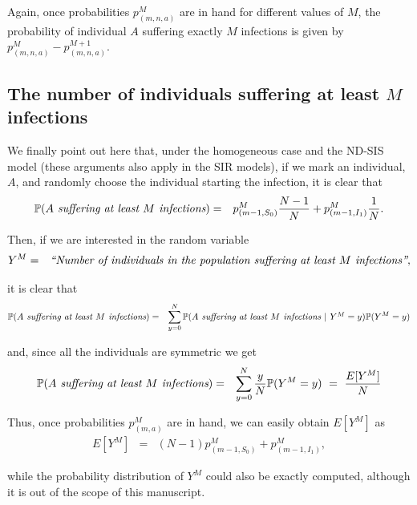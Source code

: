 \documentclass[10pt,A4paper]{article}
\begin{document}
\par\noindent Again, once probabilities $p^M_{(m,n,a)}$ are in hand for different values of $M$, the probability of individual $A$
suffering exactly $M$ infections is given by $p^M_{(m,n,a)}-p^{M+1}_{(m,n,a)}$.

\subsection{The number of individuals suffering at least $M$ infections}

\par We finally point out here that, under the homogeneous case and the ND-SIS model (these arguments also apply in the SIR models), if we mark an individual, $A$, and randomly choose the individual starting
the infection, it is clear that
\begin{eqnarray*}
\mathbb{P}(\hbox{\it $A$ suffering at least $M$ infections}) &=& p^M_{(m-1,S_0)}\frac{N-1}{N}+p^M_{(m-1,I_1)}\frac{1}{N}.
\end{eqnarray*}
\par\noindent Then, if we are interested in the random variable
\begin{eqnarray*}
 Y^M &=& \hbox{\it ``Number of individuals in the population suffering at least $M$ infections''},
\end{eqnarray*}
\par\noindent it is clear that
\begin{eqnarray*}
 \mathbb{P}(\hbox{\it $A$ suffering at least $M$ infections}) &=& \sum\limits_{y=0}^N\mathbb{P}(\hbox{\it $A$ suffering at least $M$ infections $|$ $Y^M=y$})\mathbb{P}(Y^M=y)
\end{eqnarray*}
\par\noindent and, since all the individuals are symmetric we get
\begin{eqnarray*}
 \mathbb{P}(\hbox{\it $A$ suffering at least $M$ infections}) &=& \sum\limits_{y=0}^N\frac{y}{N}\mathbb{P}(Y^M=y) \ = \ \frac{E[Y^M]}{N}
\end{eqnarray*}
\par\noindent Thus, once probabilities $p^M_{(m,a)}$ are in hand, we can easily obtain $E[Y^M]$ as
\begin{eqnarray*}
E[Y^M] &=& (N-1)p^M_{(m-1,S_0)}+p^M_{(m-1,I_1)},
\end{eqnarray*}
\par\noindent while the probability distribution of $Y^M$ could also be exactly computed, although it is out of the scope of this manuscript.
\end{document}
